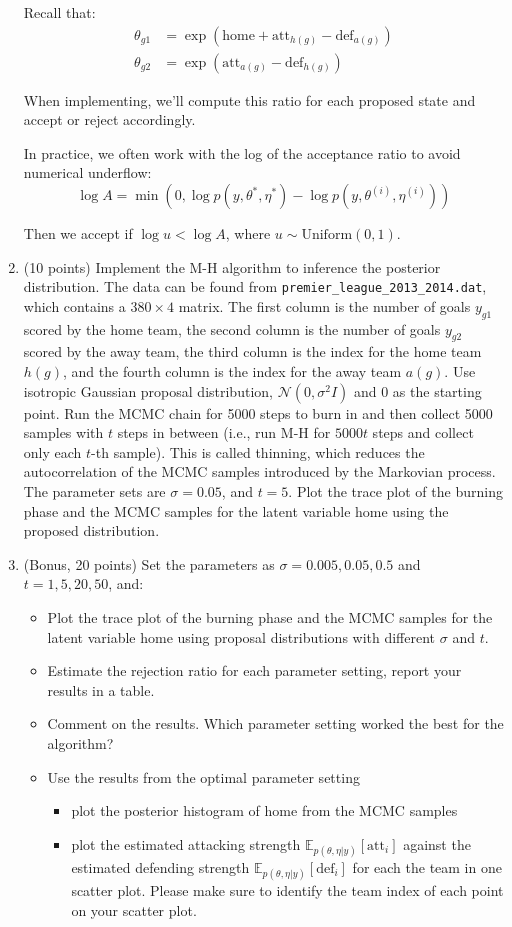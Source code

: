 \documentclass{article}
\begin{document}
\begin{enumerate}
Recall that:
\begin{align}
\theta_{g1} &= \exp(\text{home} + \text{att}_{h(g)} - \text{def}_{a(g)}) \\
\theta_{g2} &= \exp(\text{att}_{a(g)} - \text{def}_{h(g)})
\end{align}

When implementing, we'll compute this ratio for each proposed state and accept or reject accordingly.

In practice, we often work with the log of the acceptance ratio to avoid numerical underflow:
\[
\log A = \min\left(0, \log p(y, \theta^*, \eta^*) - \log p(y, \theta^{(i)}, \eta^{(i)})\right)
\]

Then we accept if $\log u < \log A$, where $u \sim \text{Uniform}(0, 1)$.
\item (10 points) Implement the M-H algorithm to inference the posterior distribution. The data can be found
from \texttt{premier\_league\_2013\_2014.dat}, which contains a $380 \times 4$ matrix. The first column is the number
of goals $y_{g1}$ scored by the home team, the second column is the number of goals $y_{g2}$ scored by the away
team, the third column is the index for the home team $h(g)$, and the fourth column is the index for the
away team $a(g)$. Use isotropic Gaussian proposal distribution, $\mathcal{N}(0, \sigma^2I)$ and 0 as the starting point.
Run the MCMC chain for 5000 steps to burn in and then collect 5000 samples with $t$ steps in between
(i.e., run M-H for $5000t$ steps and collect only each $t$-th sample). This is called thinning, which reduces
the autocorrelation of the MCMC samples introduced by the Markovian process. The parameter sets
are $\sigma = 0.05$, and $t = 5$. Plot the trace plot of the burning phase and the MCMC samples for the latent
variable home using the proposed distribution.

\item (Bonus, 20 points) Set the parameters as $\sigma = 0.005, 0.05, 0.5$ and $t = 1, 5, 20, 50$, and:
\begin{itemize}
\item Plot the trace plot of the burning phase and the MCMC samples for the latent variable home using
proposal distributions with different $\sigma$ and $t$.
\item Estimate the rejection ratio for each parameter setting, report your results in a table.
\item Comment on the results. Which parameter setting worked the best for the algorithm?
\item Use the results from the optimal parameter setting
\begin{itemize}
\item plot the posterior histogram of home from the MCMC samples
\item plot the estimated attacking strength $\mathbb{E}_{p(\theta,\eta|y)}[\text{att}_i]$ against the estimated defending strength
$\mathbb{E}_{p(\theta,\eta|y)}[\text{def}_i]$ for each the team in one scatter plot. Please make sure to identify the team
index of each point on your scatter plot.
\end{itemize}
\end{itemize}
\end{enumerate}
\end{document}
